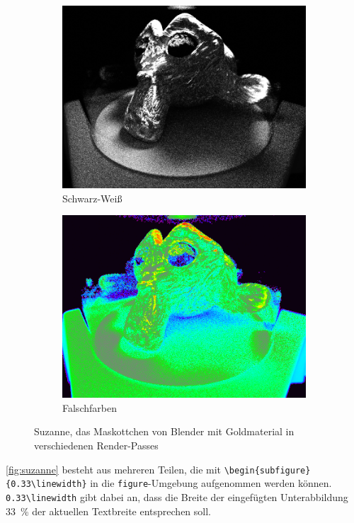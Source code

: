 \begin{figure}[!b]
\begin{subfigure}{0.33\linewidth}
				\includegraphics[width=\linewidth]{Medien/suzanne-sw}
				\caption{Schwarz-Weiß}
			\end{subfigure}
			\begin{subfigure}{0.33\linewidth}
				\includegraphics[width=\linewidth]{Medien/suzanne-false-color}
				\caption{Falschfarben}
			\end{subfigure}
			\caption[Suzanne in verschiedenen Renderpasses]{Suzanne, das Maskottchen von Blender mit Goldmaterial in verschiedenen Render-Passes}
			\label{fig:suzanne}
		\end{figure}
		\autoref{fig:suzanne} besteht aus mehreren Teilen, die mit  \lstinline[language=thesis-latexbeispiel]|\begin{subfigure}{0.33\linewidth}| in die \lstinline[language=thesis-latexbeispiel]|figure|-Umgebung aufgenommen werden können. 
		\lstinline[language=thesis-latexbeispiel]|0.33\linewidth| gibt dabei an, dass die Breite der eingefügten Unterabbildung \SI{33}{\percent} der aktuellen Textbreite entsprechen soll.
		
